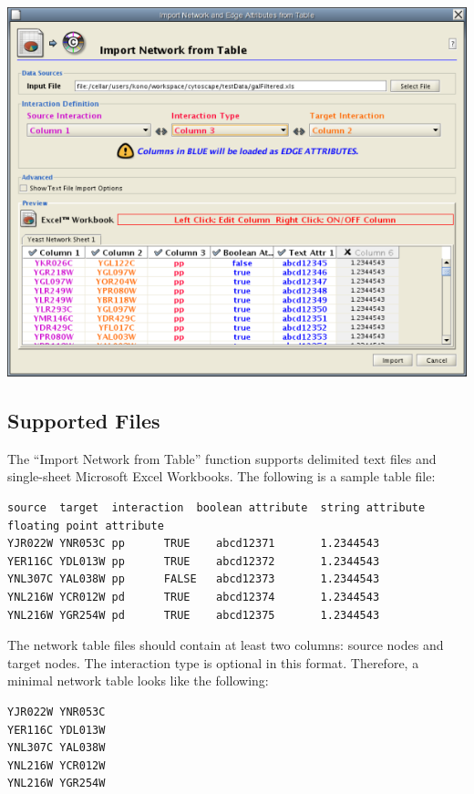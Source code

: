 \begin{center}
 \includegraphics[width=\textwidth]{images/network_table_import.png} 
\end{center}

\subsection{Supported Files}
 The ``Import Network from Table'' function supports delimited text files and single-sheet Microsoft Excel Workbooks. The following is a sample table file: 

 \begin{verbatim}
source  target  interaction  boolean attribute  string attribute        floating point attribute
YJR022W YNR053C pp      TRUE    abcd12371       1.2344543
YER116C YDL013W pp      TRUE    abcd12372       1.2344543
YNL307C YAL038W pp      FALSE   abcd12373       1.2344543
YNL216W YCR012W pd      TRUE    abcd12374       1.2344543
YNL216W YGR254W pd      TRUE    abcd12375       1.2344543
\end{verbatim}

 The network table files should contain at least two columns: source nodes and target nodes. The interaction type is optional in this format. Therefore, a minimal network table looks like the following: 

 \begin{verbatim}
YJR022W YNR053C
YER116C YDL013W
YNL307C YAL038W
YNL216W YCR012W
YNL216W YGR254W
\end{verbatim}

